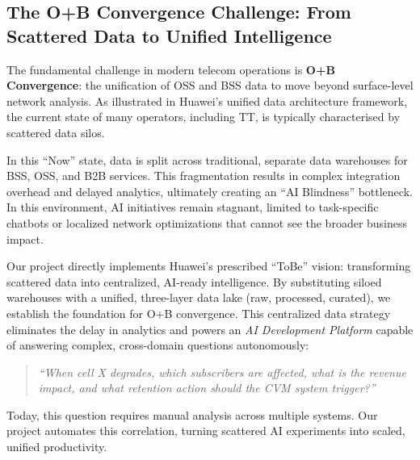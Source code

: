 \subsection{The O+B Convergence Challenge: From Scattered Data to Unified Intelligence}

The fundamental challenge in modern telecom operations is \textbf{O+B Convergence}: the unification of OSS and BSS data to move beyond surface-level network analysis. As illustrated in Huawei's unified data architecture framework, the current state of many operators, including TT, is typically characterised by scattered data silos.

In this ``Now'' state, data is split across traditional, separate data warehouses for BSS, OSS, and B2B services. This fragmentation results in complex integration overhead and delayed analytics, ultimately creating an ``AI Blindness'' bottleneck. In this environment, AI initiatives remain stagnant, limited to task-specific chatbots or localized network optimizations that cannot see the broader business impact.

Our project directly implements Huawei's prescribed ``ToBe'' vision: transforming scattered data into centralized, AI-ready intelligence. By substituting siloed warehouses with a unified, three-layer data lake (raw, processed, curated), we establish the foundation for O+B convergence. This centralized data strategy eliminates the delay in analytics and powers an \emph{AI Development Platform} capable of answering complex, cross-domain questions autonomously:

\begin{quote}
\emph{``When cell X degrades, which subscribers are affected, what is the revenue impact, and what retention action should the CVM system trigger?''}
\end{quote}

Today, this question requires manual analysis across multiple systems. Our project automates this correlation, turning scattered AI experiments into scaled, unified productivity.

